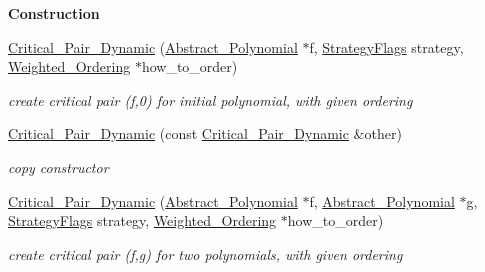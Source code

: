 \begin{Indent}\textbf{ Construction}\par
\begin{DoxyCompactItemize}
\item 
\mbox{\label{group___g_b_computation_a121415e702ea63da6444839d9f59669a}} 
\hyperlink{group___g_b_computation_a121415e702ea63da6444839d9f59669a}{Critical\+\_\+\+Pair\+\_\+\+Dynamic} (\hyperlink{group__polygroup_class_abstract___polynomial}{Abstract\+\_\+\+Polynomial} $\ast$f, \hyperlink{group__strategygroup_ga0ee6c8e033547330e6b89929730007f4}{Strategy\+Flags} strategy, \hyperlink{group__orderinggroup_class_weighted___ordering}{Weighted\+\_\+\+Ordering} $\ast$how\+\_\+to\+\_\+order)
\begin{DoxyCompactList}\small\item\em create critical pair (f,0) for initial polynomial, with given ordering \end{DoxyCompactList}\item 
\mbox{\label{group___g_b_computation_a7462f310a8e56a1666294f2e2d799e6c}} 
\hyperlink{group___g_b_computation_a7462f310a8e56a1666294f2e2d799e6c}{Critical\+\_\+\+Pair\+\_\+\+Dynamic} (const \hyperlink{group___g_b_computation_class_critical___pair___dynamic}{Critical\+\_\+\+Pair\+\_\+\+Dynamic} \&other)
\begin{DoxyCompactList}\small\item\em copy constructor \end{DoxyCompactList}\item 
\mbox{\label{group___g_b_computation_afe29c049d24e98470ba7099d25a01b15}} 
\hyperlink{group___g_b_computation_afe29c049d24e98470ba7099d25a01b15}{Critical\+\_\+\+Pair\+\_\+\+Dynamic} (\hyperlink{group__polygroup_class_abstract___polynomial}{Abstract\+\_\+\+Polynomial} $\ast$f, \hyperlink{group__polygroup_class_abstract___polynomial}{Abstract\+\_\+\+Polynomial} $\ast$g, \hyperlink{group__strategygroup_ga0ee6c8e033547330e6b89929730007f4}{Strategy\+Flags} strategy, \hyperlink{group__orderinggroup_class_weighted___ordering}{Weighted\+\_\+\+Ordering} $\ast$how\+\_\+to\+\_\+order)
\begin{DoxyCompactList}\small\item\em create critical pair (f,g) for two polynomials, with given ordering \end{DoxyCompactList}\end{DoxyCompactItemize}
\end{Indent}
